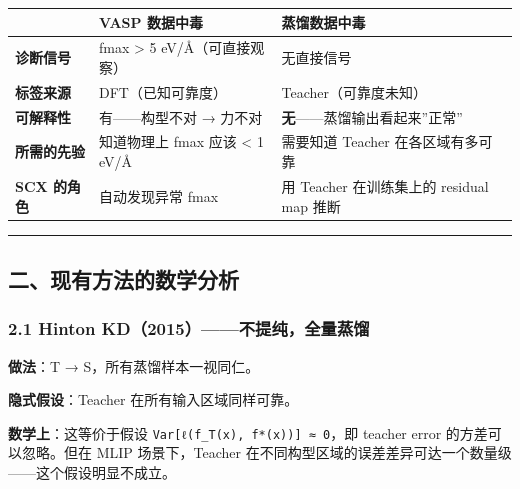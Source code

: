 \documentclass[
  12pt,
]{ctexart}
\begin{document}
\begin{longtable}[]{@{}
  >{\raggedright\arraybackslash}p{}
  >{\raggedright\arraybackslash}p{}
  >{\raggedright\arraybackslash}p{}@{}}
\toprule\noalign{}
\begin{minipage}[b]{\linewidth}\raggedright
\end{minipage} & \begin{minipage}[b]{\linewidth}\raggedright
VASP 数据中毒
\end{minipage} & \begin{minipage}[b]{\linewidth}\raggedright
蒸馏数据中毒
\end{minipage} \\
\midrule\noalign{}
\endhead
\bottomrule\noalign{}
\endlastfoot
\textbf{诊断信号} & fmax \textgreater{} 5 eV/Å（可直接观察） &
无直接信号 \\
\textbf{标签来源} & DFT（已知可靠度） & Teacher（可靠度未知） \\
\textbf{可解释性} & 有------构型不对 → 力不对 &
\textbf{无}------蒸馏输出看起来''正常'' \\
\textbf{所需的先验} & 知道物理上 fmax 应该 \textless{} 1 eV/Å & 需要知道
Teacher 在各区域有多可靠 \\
\textbf{SCX 的角色} & 自动发现异常 fmax & 用 Teacher 在训练集上的
residual map 推断 \\
\end{longtable}

\begin{center}\rule{0.5\linewidth}{0.5pt}\end{center}

\subsection{二、现有方法的数学分析}\label{ux4e8cux73b0ux6709ux65b9ux6cd5ux7684ux6570ux5b66ux5206ux6790}

\subsubsection{2.1 Hinton
KD（2015）------不提纯，全量蒸馏}\label{hinton-kd2015ux4e0dux63d0ux7eafux5168ux91cfux84b8ux998f}

\textbf{做法}：T → S，所有蒸馏样本一视同仁。

\textbf{隐式假设}：Teacher 在所有输入区域同样可靠。

\textbf{数学上}：这等价于假设
\texttt{Var{[}ℓ(f\_T(x),\ f*(x)){]}\ ≈\ 0}，即 teacher error
的方差可以忽略。但在 MLIP 场景下，Teacher
在不同构型区域的误差差异可达一个数量级------这个假设明显不成立。
\end{document}
